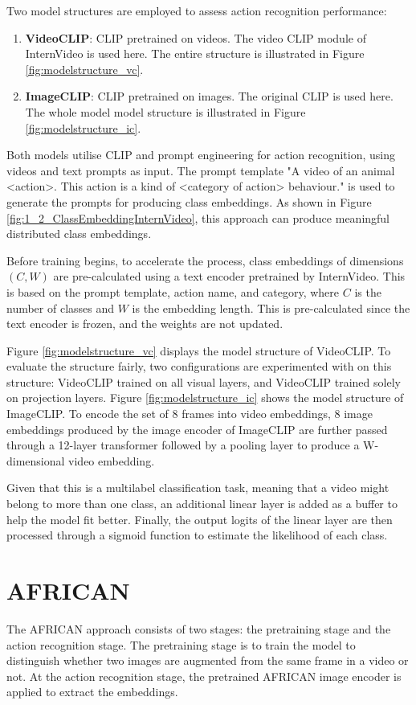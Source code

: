 Two model structures are employed to assess action recognition performance: 
\begin{enumerate}
    \item \textbf{VideoCLIP}: CLIP pretrained on videos. The video CLIP module of InternVideo \parencite{wang2022internvideo} is used here. The entire structure is illustrated in Figure \ref{fig:modelstructure_vc}.
    \item \textbf{ImageCLIP}: CLIP pretrained on images. The original CLIP \parencite{radford2021learning} is used here. The whole model model structure is illustrated in Figure \ref{fig:modelstructure_ic}.
\end{enumerate}

Both models utilise CLIP and prompt engineering for action recognition, using videos and text prompts as input. The prompt template "A video of an animal <action>. This action is a kind of <category of action> behaviour." is used to generate the prompts for producing class embeddings. As shown in Figure \ref{fig:1_2_ClassEmbeddingInternVideo}, this approach can produce meaningful distributed class embeddings.

Before training begins, to accelerate the process, class embeddings of dimensions $(C, W)$ are pre-calculated using a text encoder pretrained by InternVideo. This is based on the prompt template, action name, and category, where $C$ is the number of classes and $W$ is the embedding length. This is pre-calculated since the text encoder is frozen, and the weights are not updated. 

Figure \ref{fig:modelstructure_vc} displays the model structure of VideoCLIP. To evaluate the structure fairly, two configurations are experimented with on this structure: VideoCLIP trained on all visual layers, and VideoCLIP trained solely on projection layers. Figure \ref{fig:modelstructure_ic} shows the model structure of ImageCLIP. To encode the set of 8 frames into video embeddings, 8 image embeddings produced by the image encoder of ImageCLIP are further passed through a 12-layer transformer followed by a pooling layer to produce a W-dimensional video embedding.

Given that this is a multilabel classification task, meaning that a video might belong to more than one class, an additional linear layer is added as a buffer to help the model fit better. Finally, the output logits of the linear layer are then processed through a sigmoid function to estimate the likelihood of each class.

\section{AFRICAN}
The AFRICAN approach consists of two stages: the pretraining stage and the action recognition stage. The pretraining stage is to train the model to distinguish whether two images are augmented from the same frame in a video or not. At the action recognition stage, the pretrained AFRICAN image encoder is applied to extract the embeddings. 


